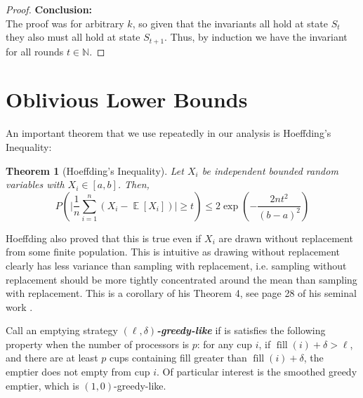 \documentclass[twocolumn]{article}[11pt]
\newcommand{\defn}[1]{{\textit{\textbf{\boldmath #1}}}}
\DeclareMathOperator{\E}{\mathbb{E}}
\DeclareMathOperator{\fil}{\text{fill}}
\newtheorem{theorem}{Theorem}
\begin{document}
\begin{proof}






\textbf{Conclusion:}\\
The proof was for arbitrary $k$, so given that the invariants all hold at state
$S_t$ they also must all hold at state $S_{t+1}$.
Thus, by induction we have the invariant for all rounds $t\in\mathbb{N}$.
\end{proof}


\section{Oblivious Lower Bounds}\label{sec:oblivious}

An important theorem that we use repeatedly in our analysis is Hoeffding's Inequality:
\begin{theorem}[Hoeffding's Inequality]
  Let $X_i$ be independent bounded random variables with $X_i \in [a,b]$. Then,
  $$P\left(\Big|\frac{1}{n} \sum_{i=1}^n (X_i - \E[X_i])\Big|\ge t\right) \le
  2\exp\left(-\frac{2nt^2}{(b-a)^2}\right) $$
\end{theorem}
Hoeffding also proved that this is true even if $X_i$ are drawn without
replacement from some finite population. This is intuitive as drawing without
replacement clearly has less variance than sampling with replacement, i.e.
sampling without replacement should be more tightly concentrated around the
mean than sampling with replacement. This is a corollary of his Theorem 4, see
page 28 of his seminal work \cite{who62}.

Call an emptying strategy $(\ell, \delta)$\defn{-greedy-like} if is satisfies
the following property when the number of processors is $p$: for any cup
$i$, if $\fil(i) + \delta > \ell$, and there are at least $p$ cups containing fill
greater than $\fil(i) + \delta$, the emptier does not empty from cup $i$.
Of particular interest is the smoothed greedy emptier, which is $(1, 0)$-greedy-like.
\end{document}

